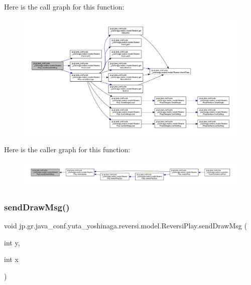 Here is the call graph for this function\+:
\nopagebreak
\begin{figure}[H]
\begin{center}
\leavevmode
\includegraphics[width=350pt]{classjp_1_1gr_1_1java__conf_1_1yuta__yoshinaga_1_1reversi_1_1model_1_1_reversi_play_a866c2788aa9dd7eb2084da9fc5e5bd5c_cgraph}
\end{center}
\end{figure}
Here is the caller graph for this function\+:
\nopagebreak
\begin{figure}[H]
\begin{center}
\leavevmode
\includegraphics[width=350pt]{classjp_1_1gr_1_1java__conf_1_1yuta__yoshinaga_1_1reversi_1_1model_1_1_reversi_play_a866c2788aa9dd7eb2084da9fc5e5bd5c_icgraph}
\end{center}
\end{figure}
\mbox{\label{classjp_1_1gr_1_1java__conf_1_1yuta__yoshinaga_1_1reversi_1_1model_1_1_reversi_play_a93ebdb5fb7097984730a85f62ebb57d7}} 
\subsubsection{\texorpdfstring{send\+Draw\+Msg()}{sendDrawMsg()}}
{\footnotesize\ttfamily void jp.\+gr.\+java\+\_\+conf.\+yuta\+\_\+yoshinaga.\+reversi.\+model.\+Reversi\+Play.\+send\+Draw\+Msg (\begin{DoxyParamCaption}\item[{int}]{y,  }\item[{int}]{x }\end{DoxyParamCaption})}



